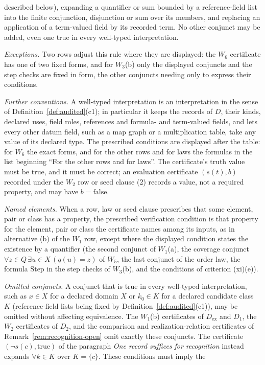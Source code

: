 \documentclass[11pt]{article}
\theoremstyle{definition}
\begin{document}
described below), expanding a quantifier or sum bounded by a reference-field
list into the finite conjunction, disjunction or sum over its members, and
replacing an application of a term-valued field by its recorded term. No other
conjunct may be added, even one true in every well-typed interpretation. \par\emph{Exceptions.} Two rows adjust this rule where they are displayed: the \(W_6\) certificate has one of two fixed forms, and for \(W_3\)(b) only the displayed conjuncts and the step checks are fixed in form, the other conjuncts needing only to express their conditions. \par\emph{Further conventions.} A well-typed interpretation is an interpretation in the sense of Definition~\ref{def:audited}(c1); in particular it
keeps the records of \(D\), their kinds, declared uses, field roles, references
and formula- and term-valued fields, and lets every other datum field, such as
a map graph or a multiplication table, take any value of its declared type.
The prescribed conditions are displayed after the table: for \(W_6\) the exact
forms, and for the other rows and for laws the formulas in the list beginning
``For the other rows and for laws''. The certificate's truth value must be
true, and it must be correct; an evaluation certificate \((s(t),b)\) recorded
under the \(W_2\) row or seed clause (2) records a value, not a required
property, and may have \(b=\mathrm{false}\). \par\emph{Named elements.} When a row, law or seed clause prescribes that some element, pair or class has a property, the prescribed
verification condition is that property for the element, pair or class the
certificate names among its inputs, as in alternative (b) of the \(W_1\) row, except where the displayed condition states the existence by a quantifier (the second conjunct of \(W_1\)(a), the coverage conjunct \(\forall z\in Q\,\exists u\in X\,(q(u)=z)\) of \(W_5\), the last conjunct of the order law, the formula \(\mathrm{Step}\) in the step checks of \(W_3\)(b), and the conditions of criterion (xi)(e)). \par\emph{Omitted conjuncts.} A conjunct that is true in every well-typed interpretation, such as \(x\in X\) for a declared domain \(X\) or \(k_0\in K\) for a declared candidate class \(K\) (reference-field lists being fixed by Definition~\ref{def:audited}(c1)), may be omitted without affecting equivalence. The \(W_1\)(b) certificates of \(D_{\mathrm{ex}}\) and \(D_1\), the \(W_2\) certificates of \(D_2\), and the comparison and realization-relation certificates of Remark~\ref{rem:recognition-open} omit exactly these conjuncts. The certificate \((\neg s(c),\mathrm{true})\) of the paragraph \emph{One record suffices for recognition} instead expands \(\forall k\in K\) over \(K=\{c\}\). These conditions must imply the
\end{document}
